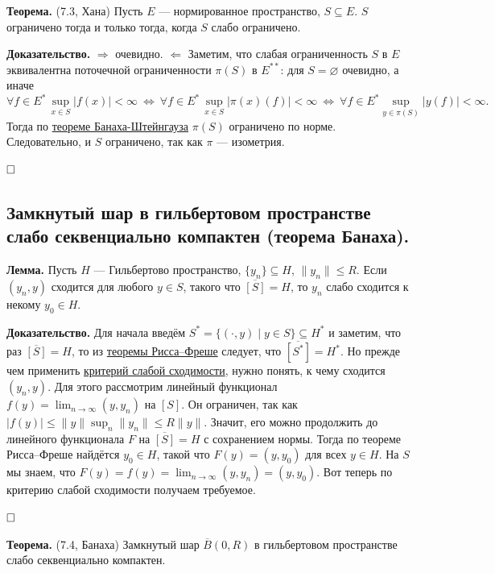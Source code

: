 \documentclass[12pt, a4paper]{article}
\newcommand{\QED}{$\hfill\square$}
\renewcommand{\le}{\leqslant}  %
\renewcommand{\subset}{\subseteq}   %
\begin{document}
 \label{th:7-3} \textbf{Теорема.} (7.3, Хана) Пусть $E$ --- нормированное пространство, $S \subset E$.
$S$ ограничено тогда и только тогда, когда $S$ слабо ограничено.

\textbf{Доказательство.}
$\Rightarrow$ очевидно. $\Leftarrow$ Заметим, что слабая ограниченность $S$ в $E$ эквивалентна поточечной ограниченности $\pi(S)$ в $E^{**}$: для $S = \varnothing$ очевидно, а иначе
\[
    \forall f \in E^* \, \sup_{x \in S} |f(x)| < \infty \ \Longleftrightarrow \ \forall f \in E^* \, \sup_{x \in S} |\pi(x)(f)| < \infty \ \Longleftrightarrow \ \forall f \in E^* \! \sup_{y \in \pi(S)} |y(f)| < \infty.
\]
Тогда по \hyperref[th:5-4]{теореме Банаха-Штейнгауза} $\pi(S)$ ограничено по норме. Следовательно, и $S$ ограничено, так как $\pi$ --- изометрия.

\QED



\subsection{Замкнутый шар в гильбертовом пространстве слабо секвенциально компактен (теорема Банаха).}

\textbf{Лемма.}  \label{7.4_lemma} Пусть $H$ --- Гильбертово пространство, $\{y_n\} \subset H$, $\|y_n\| \le R$. Если $(y_n, y)$ сходится для любого $y \in S$, такого что $\overline{[S]} = H$, то $y_n$ слабо сходится к некому $y_0 \in H$.

\textbf{Доказательство.} Для начала введём $S^* = \{(\cdot, y) \mid y \in S\} \subset H^*$ и заметим, что раз $\overline{[S]} = H$, то из \hyperref[th:6-1]{теоремы Рисса--Фреше} следует, что $\overline{[S^*]} = H^*$. Но прежде чем применить \hyperref[th:7-1]{критерий слабой сходимости}, нужно понять, к чему сходится $(y_n, y)$. Для этого рассмотрим линейный функционал $f(y) = \lim_{n \to \infty} (y, y_n)$ на $[S]$. Он ограничен, так как $|f(y)| \le \|y\|\sup_{n} \|y_n\| \le R\|y\|$. Значит, его можно продолжить до линейного функционала $F$ на $\overline{[S]} = H$ с сохранением нормы. Тогда по теореме Рисса--Фреше найдётся $y_0 \in H$, такой что $F(y) = (y, y_0)$ для всех $y \in H$. На $S$ мы знаем, что $F(y) = f(y) = \lim_{n \to \infty} (y, y_n) = (y, y_0)$. Вот теперь по критерию слабой сходимости получаем требуемое. 

\QED

 \label{th:7-4} \textbf{Теорема.} (7.4, Банаха) Замкнутый шар $\overline B(0, R)$ в гильбертовом пространстве слабо секвенциально компактен.
\end{document}
